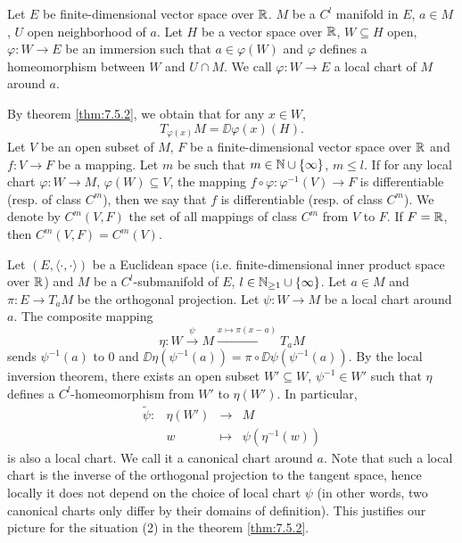 \begin{definitionenv}
    Let $E$ be finite-dimensional vector space over $\mathbb{R}$.
    $M$ be a $C^l$ manifold in $E$, $a \in M$, $U$ open neighborhood of $a$.
    Let $H$ be a vector space over $\mathbb{R}$, $W \subseteq H$ open, $\varphi : W \longrightarrow E$ be an immersion such that $a \in \varphi(W)$ and $\varphi$ defines a homeomorphism between $W$ and $U \cap M$.
    We call $\varphi : W \longrightarrow E$ a local chart of $M$ around $a$.

    \quad By theorem \ref{thm:7.5.2}, we obtain that for any $x \in W$,
    $$T_{\varphi(x)}M = \DD \varphi(x)(H).$$
    Let $V$ be an open subset of $M$, $F$ be a finite-dimensional vector space over $\mathbb{R}$ and $f : V \longrightarrow F$ be a mapping.
    Let $m$ be such that $m \in \mathbb{N} \cup \{\infty\}$, $m \le l$.
    If for any local chart $\varphi : W \longrightarrow M$, $\varphi(W) \subseteq V$, the mapping $f \circ \varphi : \varphi^{-1}(V) \longrightarrow F$ is differentiable (resp. of class $C^m$),
    then we say that $f$ is differentiable (resp. of class $C^m$).
    We denote by $C^m(V,F)$ the set of all mappings of class $C^m$ from $V$ to $F$.
    If $F = \mathbb{R}$, then $C^m(V,F) = C^m(V)$.
\end{definitionenv}

\begin{exampleenv}
    Let $(E,\langle \cdot , \cdot \rangle)$ be a Euclidean space (i.e. finite-dimensional inner product space over $\mathbb{R}$) and $M$ be a $C^l$-submanifold of $E$, $l \in \mathbb{N}_{\ge 1} \cup \{\infty\}$.
    Let $a \in M$ and $\pi : E \longrightarrow T_a M$ be the orthogonal projection. Let $\psi : W \longrightarrow M$ be a local chart around $a$.
    The composite mapping
    $$\eta : W \overset{\psi}{\longrightarrow} M \overset{x \mapsto \pi(x - a)}{\longrightarrow} T_a M$$
    sends $\psi^{-1}(a)$ to $0$ and $\DD \eta (\psi^{-1}(a)) = \pi \circ \DD \psi(\psi^{-1}(a))$.
    By the local inversion theorem, there exists an open subset $W' \subseteq W$, $\psi^{-1} \in W'$ such that $\eta$ defines a $C^l$-homeomorphism from $W'$ to $\eta(W')$.
    In particular,
    $$\begin{array}{rrcl}
        \tilde{\psi} : & \eta(W') & \longrightarrow & M\\
        & w & \longmapsto & \psi(\eta^{-1}(w))
    \end{array}$$
    is also a local chart.
    We call it a canonical chart around $a$.
    Note that such a local chart is the inverse of the orthogonal projection to the tangent space,
    hence locally it does not depend on the choice of local chart $\psi$ (in other words, two canonical charts only differ by their domains of definition).
    This justifies our picture for the situation (2) in the theorem \ref{thm:7.5.2}.
\end{exampleenv}

